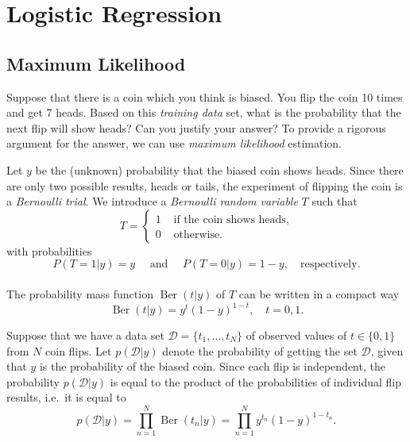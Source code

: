\documentclass[
]{article}
\author{}
\date{}
\begin{document}
\newcommand{\Ber}{\operatorname{Ber}}
\newcommand{\E}{\operatorname{E}}
\newcommand{\V}{\operatorname{Var}}
\newcommand{\diag}{\operatorname{diag}}

\newcommand{\bi}{\mathbf{i}}
\newcommand{\bj}{\mathbf{j}}
\newcommand{\bt}{\mathbf{t}}

\newcommand{\bw}{{\boldsymbol{w}}}
\newcommand{\bv}{{\boldsymbol{v}}}
\newcommand{\bx}{{\boldsymbol{x}}}
\newcommand{\by}{{\boldsymbol{y}}}
\newcommand{\bb}{{\boldsymbol{b}}}
\newcommand{\bz}{{\boldsymbol{z}}}
\newcommand{\bu}{{\boldsymbol{u}}}
\newcommand{\bX}{{\boldsymbol{X}}}
\newcommand{\bY}{{\boldsymbol{Y}}}
\newcommand{\bZ}{{\boldsymbol{Z}}}

\hypertarget{logistic-regression}{%
\section{Logistic Regression}\label{logistic-regression}}

\hypertarget{maximum-likelihood}{%
\subsection{Maximum Likelihood}\label{maximum-likelihood}}

Suppose that there is a coin which you think is biased. You flip the
coin 10 times and get 7 heads. Based on this \emph{training data} set,
what is the probability that the next flip will show heads? Can you
justify your answer? To provide a rigorous argument for the answer, we
can use \emph{maximum likelihood} estimation.

Let \(y\) be the (unknown) probability that the biased coin shows heads.
Since there are only two possible results, heads or tails, the
experiment of flipping the coin is a \emph{Bernoulli trial}. We
introduce a \emph{Bernoulli random variable} \(T\) such that
\[ T=\begin{cases} 1 & \text{ if the coin shows heads}, \\ 0 & \text{ otherwise}. \end{cases} \]
with probabilities
\[ P(T=1|y)=y \quad \text{ and } \quad P(T=0|y)=1-y, \quad \text{respectively}. \]\\
The probability mass function \(\operatorname{Ber}(t|y)\) of \(T\) can
be written in a compact way
\[ \operatorname{Ber}(t|y)= y^t (1-y)^{1-t}, \quad t=0,1. \]

Suppose that we have a data set \(\mathcal D = \{ t_1, \dots, t_N \}\)
of observed values of \(t \in \{ 0,1 \}\) from \(N\) coin flips. Let
\(p(\mathcal D|y)\) denote the probability of getting the set
\(\mathcal D\), given that \(y\) is the probability of the biased coin.
Since each flip is independent, the probability \(p(\mathcal D|y)\) is
equal to the product of the probabilities of individual flip results,
i.e.~it is equal to
\[ p(\mathcal D| y) = \prod_{n=1}^N \operatorname{Ber}(t_n|y) = \prod_{n=1}^N y^{t_n} (1-y)^{1-t_n}. \]
\end{document}

